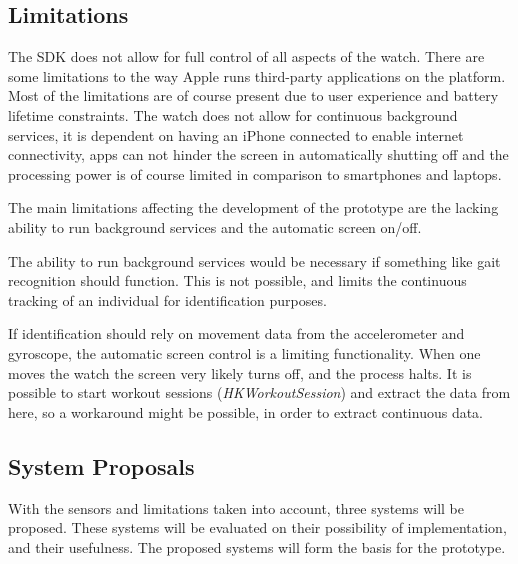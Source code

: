 \subsection{Limitations}
The SDK does not allow for full control of all aspects of the watch. There are
some limitations to the way Apple runs third-party applications on the platform.
Most of the limitations are of course present due to user experience and battery
lifetime constraints. The watch does not allow for continuous background services, it is
dependent on having an iPhone connected to enable internet connectivity, apps can not
hinder the screen in automatically shutting off and the processing power is of
course limited in comparison to smartphones and laptops.

The main limitations affecting the development of the prototype are the lacking
ability to run background services and the automatic screen on/off.

The ability to run background services would be necessary if something like gait
recognition should function. This is not possible, and limits the continuous
tracking of an individual for identification purposes. 

If identification should rely on movement data from the accelerometer and
gyroscope, the automatic screen control is a limiting functionality. When one
moves the watch the screen very likely turns off, and the process halts. It is
possible to start workout sessions (\textit{HKWorkoutSession}) 
\cite{workoutsession} and extract the data from here, so a workaround might be 
possible, in order to extract continuous data.


\subsection{System Proposals}
With the sensors and limitations taken into account, three systems will be
proposed. These systems will be evaluated on their possibility of
implementation, and their usefulness.
The proposed systems will form the basis for the prototype.

